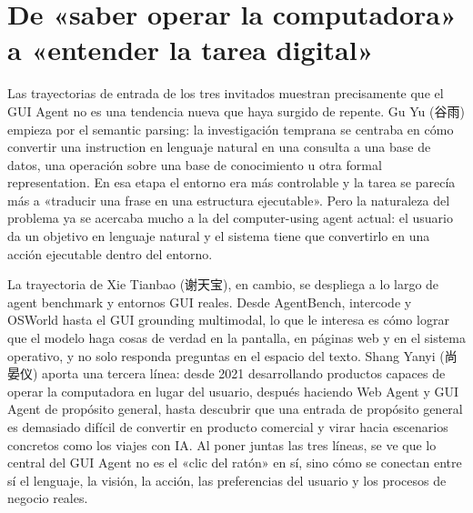 \section{De «saber operar la computadora» a «entender la tarea digital»}

Las trayectorias de entrada de los tres invitados muestran precisamente que el GUI Agent no es una tendencia nueva que haya surgido de repente. Gu Yu (谷雨) empieza por el semantic parsing: la investigación temprana se centraba en cómo convertir una instruction en lenguaje natural en una consulta a una base de datos, una operación sobre una base de conocimiento u otra formal representation. En esa etapa el entorno era más controlable y la tarea se parecía más a «traducir una frase en una estructura ejecutable». Pero la naturaleza del problema ya se acercaba mucho a la del computer-using agent actual: el usuario da un objetivo en lenguaje natural y el sistema tiene que convertirlo en una acción ejecutable dentro del entorno.

La trayectoria de Xie Tianbao (谢天宝), en cambio, se despliega a lo largo de agent benchmark y entornos GUI reales. Desde AgentBench, intercode y OSWorld hasta el GUI grounding multimodal, lo que le interesa es cómo lograr que el modelo haga cosas de verdad en la pantalla, en páginas web y en el sistema operativo, y no solo responda preguntas en el espacio del texto. Shang Yanyi (尚晏仪) aporta una tercera línea: desde 2021 desarrollando productos capaces de operar la computadora en lugar del usuario, después haciendo Web Agent y GUI Agent de propósito general, hasta descubrir que una entrada de propósito general es demasiado difícil de convertir en producto comercial y virar hacia escenarios concretos como los viajes con IA. Al poner juntas las tres líneas, se ve que lo central del GUI Agent no es el «clic del ratón» en sí, sino cómo se conectan entre sí el lenguaje, la visión, la acción, las preferencias del usuario y los procesos de negocio reales.

